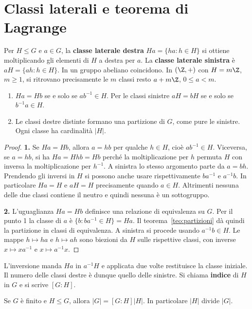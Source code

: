 \section{Classi laterali e teorema di Lagrange}
\begin{definizione}
Per $H\le G$ e $a\in G$, la \textbf{classe laterale destra} $Ha=\{ha:h\in H\}$ si ottiene moltiplicando gli elementi di $H$ a destra per $a$. La \textbf{classe laterale sinistra} è $aH=\{ah:h\in H\}$. In un gruppo abeliano coincidono. In $(\Z,+)$ con $H=m\Z$, $m\ge1$, si ritrovano precisamente le $m$ classi resto $a+m\Z$, $0\le a<m$.
\end{definizione}
\begin{proposizione}
\begin{enumerate}
\item $Ha=Hb$ se e solo se $ab^{-1}\in H$. Per le classi sinistre $aH=bH$ se e solo se $b^{-1}a\in H$.
\item Le classi destre distinte formano una partizione di $G$, come pure le sinistre. Ogni classe ha cardinalità $|H|$.
\end{enumerate}
\end{proposizione}
\begin{proof}
\textbf{1.} Se $Ha=Hb$, allora $a=hb$ per qualche $h\in H$, cioè $ab^{-1}\in H$. Viceversa, se $a=hb$, si ha $Ha=Hhb=Hb$ perché la moltiplicazione per $h$ permuta $H$ con inversa la moltiplicazione per $h^{-1}$. A sinistra lo stesso argomento parte da $a=bh$. Prendendo gli inversi in $H$ si possono anche usare rispettivamente $ba^{-1}$ e $a^{-1}b$. In particolare $Ha=H$ e $aH=H$ precisamente quando $a\in H$. Altrimenti nessuna delle due classi contiene il neutro e quindi nessuna è un sottogruppo.

\textbf{2.} L'uguaglianza $Ha=Hb$ definisce una relazione di equivalenza su $G$. Per il punto 1 la classe di $a$ è $\{b:ba^{-1}\in H\}=Ha$. Il teorema~\ref{teo:partizioni} dà quindi la partizione in classi di equivalenza. A sinistra si procede usando $a^{-1}b\in H$. Le mappe $h\mapsto ha$ e $h\mapsto ah$ sono biezioni da $H$ sulle rispettive classi, con inverse $x\mapsto xa^{-1}$ e $x\mapsto a^{-1}x$.
\end{proof}
L'inversione manda $Ha$ in $a^{-1}H$ e applicata due volte restituisce la classe iniziale. Il numero delle classi destre è dunque quello delle sinistre. Si chiama \textbf{indice} di $H$ in $G$ e si scrive $[G:H]$.
\begin{teorema}[Lagrange]\label{teo:lagrange}
Se $G$ è finito e $H\le G$, allora $|G|=[G:H]|H|$. In particolare $|H|$ divide $|G|$.
\end{teorema}
